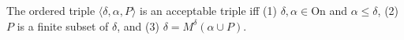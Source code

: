 The ordered triple $\langle \delta, \alpha, P \rangle$ is an acceptable triple iff
(1) $\delta, \alpha \in \text{On}$ and $\alpha \leq \delta$,
(2) $P$ is a finite subset of $\delta$, and
(3) $\delta = M^\delta(\alpha \cup P)$.
